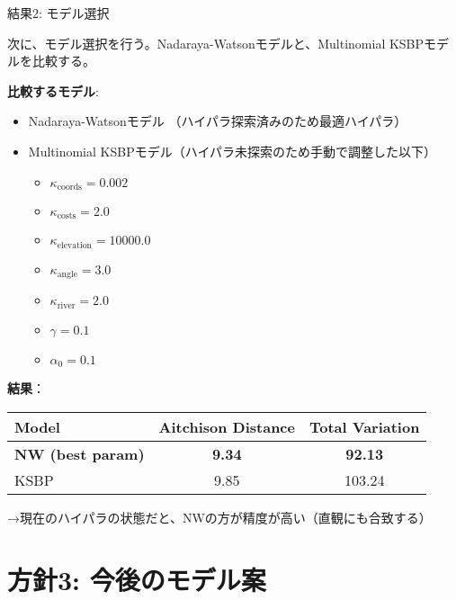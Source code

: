 \documentclass[xelatex, 8pt]{beamer}
\theoremstyle{plain}
\theoremstyle{definition}
\begin{document}
\begin{frame}{結果2: モデル選択}

    次に、モデル選択を行う。Nadaraya-Watsonモデルと、Multinomial KSBPモデルを比較する。

    \vspace{4mm}

    \textbf{比較するモデル}:
    \begin{itemize}
        \item Nadaraya-Watsonモデル （ハイパラ探索済みのため最適ハイパラ）
        \item Multinomial KSBPモデル（ハイパラ未探索のため手動で調整した以下）
        \begin{itemize}
            \item $\kappa_{\text{coords}} = 0.002$
            \item $\kappa_{\text{costs}} = 2.0$
            \item $\kappa_{\text{elevation}} = 10000.0$
            \item $\kappa_{\text{angle}} = 3.0$
            \item $\kappa_{\text{river}} = 2.0$
            \item $\gamma = 0.1$
            \item $\alpha_0 = 0.1$
        \end{itemize}
    \end{itemize}

    \vspace{5mm}

    \textbf{結果}：
    \begin{table}
        \centering
        \begin{tabular}{l|cc}
            \hline
            Model & Aitchison Distance & Total Variation \\
            \hline
            \textbf{NW (best param)} & \textbf{9.34} & \textbf{92.13} \\
            KSBP & 9.85 & 103.24 \\
            \hline
        \end{tabular}
    \end{table}

    \vspace{3mm}
    →現在のハイパラの状態だと、NWの方が精度が高い（直観にも合致する）

\end{frame}

\section{方針3: 今後のモデル案}
\end{document}
